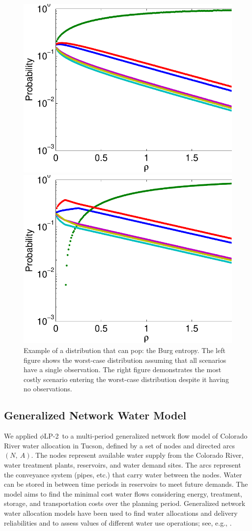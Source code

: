 \documentclass[ijoc,nonblindrev]{informs3} %
\newcommand{\plp}{$\phi$LP-2}
\begin{document}
\begin{figure}
	\FIGURE
	{%
		\includegraphics*[width=.5\textwidth]{images/burg}%
		\includegraphics*[width=.5\textwidth]{images/burg_zero}%
	}
	{
		Example of a distribution that can pop: the Burg entropy.
		The left figure shows the worst-case distribution assuming that all scenarios have a single observation.
		The right figure demonstrates the most costly scenario entering the worst-case distribution despite it having no observations.
		\label{fig:pop}
	}
	{}
\end{figure}

\subsection{Generalized Network Water Model} 
\label{ssec:network_model}

We applied \plp\ to a multi-period generalized network flow model of Colorado River water allocation in Tucson, defined by a set of nodes and directed arcs $(N,\: A)$.
The nodes represent available water supply from the Colorado River, water treatment plants, reservoirs, and water demand sites.
The arcs represent the conveyance system (pipes, etc.) that carry water between the nodes. 
Water can be stored in between time periods in reservoirs to meet future demands. 
The model aims to find the minimal cost water flows considering energy, treatment, storage, and transportation costs over the planning period. 
Generalized network water allocation models have been used to find water allocations and delivery reliabilities and to assess values of different water use operations; see, e.g., \cite{draper_etal_03}. 
\end{document}
